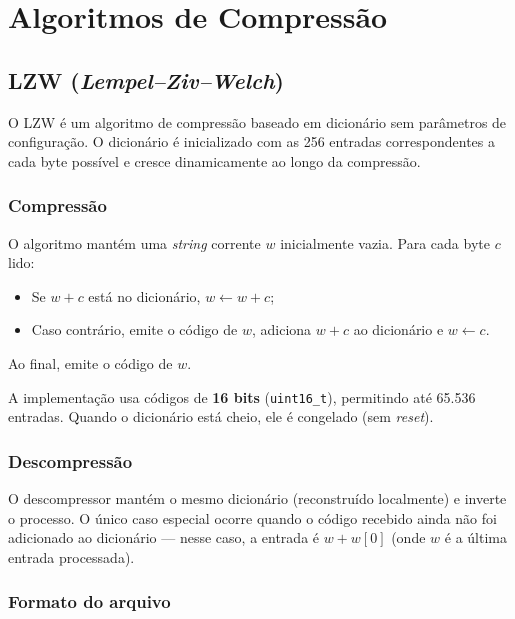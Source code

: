 \documentclass{ifpr-pinhais}
\begin{document}
\section{Algoritmos de Compressão}

\subsection{LZW (\textit{Lempel--Ziv--Welch})}

O LZW é um algoritmo de compressão baseado em dicionário sem parâmetros de configuração. O dicionário é inicializado com as 256 entradas correspondentes a cada byte possível e cresce dinamicamente ao longo da compressão.

\subsubsection{Compressão}

O algoritmo mantém uma \textit{string} corrente $w$ inicialmente vazia. Para cada byte $c$ lido:
\begin{itemize}
    \item Se $w + c$ está no dicionário, $w \leftarrow w + c$;
    \item Caso contrário, emite o código de $w$, adiciona $w + c$ ao dicionário e $w \leftarrow c$.
\end{itemize}
Ao final, emite o código de $w$.

A implementação usa códigos de \textbf{16 bits} (\texttt{uint16\_t}), permitindo até 65.536 entradas. Quando o dicionário está cheio, ele é congelado (sem \textit{reset}).

\subsubsection{Descompressão}

O descompressor mantém o mesmo dicionário (reconstruído localmente) e inverte o processo. O único caso especial ocorre quando o código recebido ainda não foi adicionado ao dicionário --- nesse caso, a entrada é $w + w[0]$ (onde $w$ é a última entrada processada).

\subsubsection{Formato do arquivo}
\end{document}

